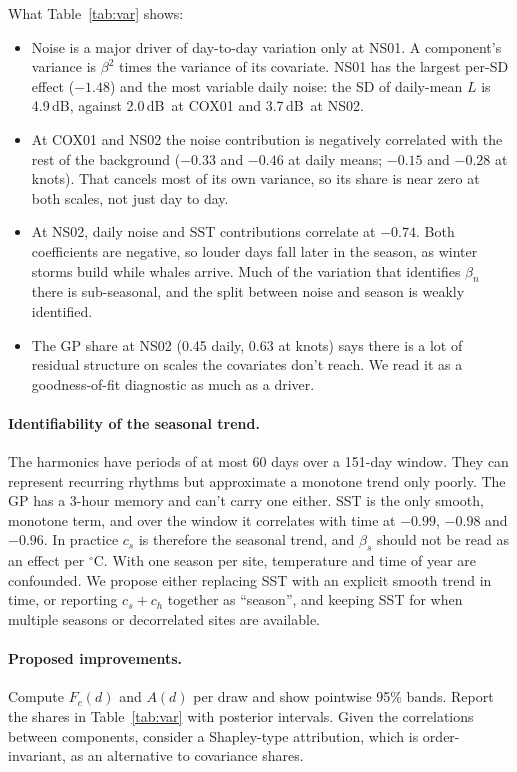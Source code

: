 \documentclass[11pt]{article}
\newcommand{\dB}{\,\textrm{dB}}
\begin{document}
What Table~\ref{tab:var} shows:
\begin{itemize}
\item Noise is a major driver of day-to-day variation only at NS01. A
  component's variance is $\beta^2$ times the variance of its covariate. NS01
  has the largest per-SD effect ($-1.48$) and the most variable daily noise:
  the SD of daily-mean $L$ is 4.9\dB, against 2.0\dB\ at COX01 and 3.7\dB\ at
  NS02.
\item At COX01 and NS02 the noise contribution is negatively correlated with
  the rest of the background ($-0.33$ and $-0.46$ at daily means; $-0.15$ and
  $-0.28$ at knots). That cancels most of its own variance, so its share is
  near zero at both scales, not just day to day.
\item At NS02, daily noise and SST contributions correlate at $-0.74$. Both
  coefficients are negative, so louder days fall later in the season, as
  winter storms build while whales arrive. Much of the variation that
  identifies $\beta_n$ there is sub-seasonal, and the split between
  noise and season is weakly identified.
\item The GP share at NS02 (0.45 daily, 0.63 at knots) says there is a lot of
  residual structure on scales the covariates don't reach. We read it as a
  goodness-of-fit diagnostic as much as a driver.
\end{itemize}

\paragraph{Identifiability of the seasonal trend.}
The harmonics have periods of at most 60 days over a 151-day window. They can
represent recurring rhythms but approximate a monotone trend only poorly. The
GP has a 3-hour memory and can't carry one either. SST is the only smooth,
monotone term, and over the window it correlates with time at $-0.99$,
$-0.98$ and $-0.96$. In practice $c_s$ is therefore the seasonal trend, and
$\beta_s$ should not be read as an effect per $^\circ$C. With one season per
site, temperature and time of year are confounded. We propose either
replacing SST with an explicit smooth trend in time, or reporting $c_s+c_h$
together as ``season'', and keeping SST for when multiple seasons or
decorrelated sites are available.

\paragraph{Proposed improvements.}
Compute $F_c(d)$ and $A(d)$ per draw and show pointwise 95\% bands. Report
the shares in Table~\ref{tab:var} with posterior intervals. Given the
correlations between components, consider a Shapley-type attribution, which
is order-invariant, as an alternative to covariance shares.
\end{document}
